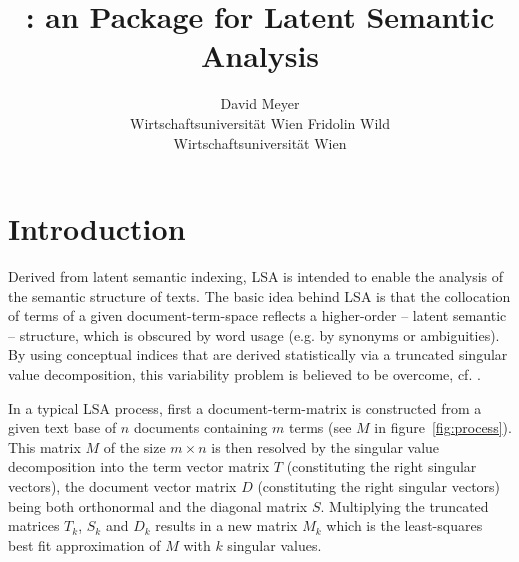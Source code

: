 \documentclass[article]{jss}
\author{David Meyer\\Wirtschaftsuniversit\"at Wien \And 
        Fridolin Wild\\Wirtschaftsuniversit\"at Wien}
\title{\pkg{lsa}: an \proglang{R} Package for Latent Semantic Analysis}
\begin{document}
\section[statistical technique]{Introduction}

  Derived from latent semantic indexing, LSA is intended to enable the 
  analysis of the semantic structure of texts. The basic idea behind LSA 
  is that the collocation of terms of a given document-term-space reflects 
  a higher-order -- latent semantic -- structure, which is obscured by 
  word usage (e.g. by synonyms or ambiguities). By using conceptual indices 
  that are derived statistically via a truncated singular value decomposition, 
  this variability problem is believed to be overcome, cf. \cite{landauer:1990}.
  
  In a typical LSA process, first a document-term-matrix is constructed 
  from a given text base of \begin{math}n\end{math} documents containing 
  \begin{math}m\end{math} terms (see \begin{math}M\end{math} in figure~\ref{fig:process}). 
  This matrix \begin{math}M\end{math} of the size \begin{math}m \times n\end{math} 
  is then resolved by the singular value decomposition into the term vector 
  matrix \begin{math}T\end{math} (constituting the right singular vectors), 
  the document vector matrix \begin{math}D\end{math} (constituting the right 
  singular vectors) being both orthonormal and the diagonal matrix 
  \begin{math}S\end{math}. Multiplying the truncated matrices 
  \begin{math}T_{k}\end{math}, \begin{math}S_{k}\end{math} and 
  \begin{math}D_{k}\end{math} results in a new matrix \begin{math}M_{k}\end{math} 
  which is the least-squares best fit approximation of 
  \begin{math}M\end{math} with \begin{math}k\end{math} singular values.
\end{document}
